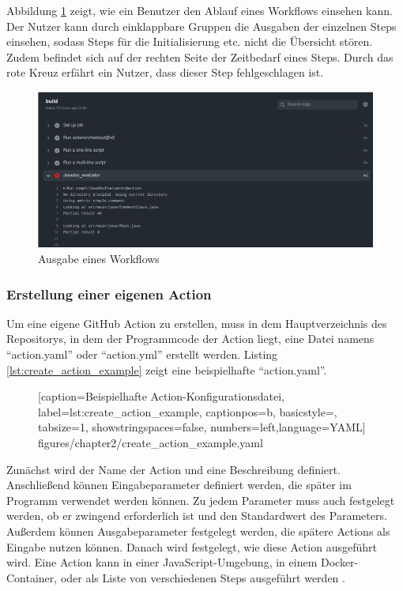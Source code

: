 Abbildung \ref{fig:workflow_output} zeigt, wie ein Benutzer den Ablauf eines Workflows einsehen kann. Der Nutzer kann durch einklappbare Gruppen die Ausgaben der einzelnen Steps einsehen, sodass Steps für die Initialisierung etc. nicht die Übersicht stören. Zudem befindet sich auf der rechten Seite der Zeitbedarf eines Steps. Durch das rote Kreuz erfährt ein Nutzer, dass dieser Step fehlgeschlagen ist. 
\begin{figure}
    \centering
    \includegraphics[width=\columnwidth]{figures/chapter2/workflow_output.png}
    \caption{Ausgabe eines Workflows}
    \label{fig:workflow_output}
\end{figure}

\subsubsection{Erstellung einer eigenen Action}
Um eine eigene GitHub Action zu erstellen, muss in dem Hauptverzeichnis des Repositorys, in dem der Programmcode der Action liegt, eine Datei namens \enquote{action.yaml} oder \enquote{action.yml} erstellt werden. Listing \ref{lst:create_action_example} zeigt eine beispielhafte \enquote{action.yaml}.
	\begin{figure}[h!]
			
			[caption={Beispielhafte Action-Konfigurationsdatei},
			label={lst:create_action_example},
			captionpos=b, basicstyle=\footnotesize, tabsize=1, showstringspaces=false,  numbers=left,language=YAML]
			{figures/chapter2/create_action_example.yaml}
		\end{figure}
Zunächst wird der Name der Action und eine Beschreibung definiert. Anschließend können Eingabeparameter definiert werden, die später im Programm verwendet werden können. Zu jedem Parameter muss auch festgelegt werden, ob er zwingend erforderlich ist und den Standardwert des Parameters. Außerdem können Ausgabeparameter festgelegt werden, die spätere Actions als Eingabe nutzen können. Danach wird festgelegt, wie diese Action ausgeführt wird. Eine Action kann in einer JavaScript-Umgebung, in einem Docker-Container, oder als Liste von verschiedenen Steps ausgeführt werden \cite[S. 117ff.]{github_action_book}. 


